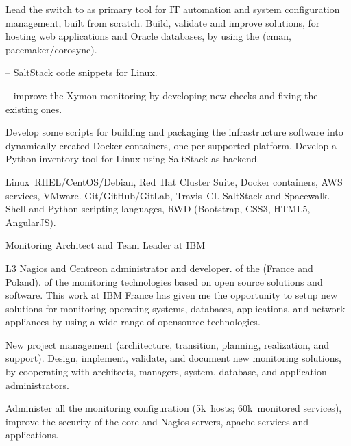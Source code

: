 \smallskip\noindent
\tasks
Lead the switch to  as primary tool for IT automation and system
configuration management, built from scratch.
Build, validate and improve  solutions,
for hosting web applications and Oracle databases, by using the
 (cman, pacemaker/corosync).

\smallskip\noindent
\software
{} --
SaltStack code snippets for Linux.

\tinyskip\noindent
{} --
improve the Xymon monitoring by developing new checks and fixing the
existing ones.

\tinyskip\noindent
Develop some scripts for building and packaging the infrastructure software
into dynamically created Docker containers, one per supported platform.
Develop a Python inventory tool for Linux using SaltStack as backend.

\tinyskip\noindent
\technologies
Linux~RHEL/CentOS/Debian, Red~Hat Cluster Suite, Docker containers,
AWS services, VMware. Git/GitHub/GitLab, Travis~CI. SaltStack and Spacewalk.
Shell and Python scripting languages, RWD (Bootstrap, CSS3, HTML5, AngularJS).


   {Monitoring Architect and Team Leader at IBM}

L3 Nagios and Centreon administrator and developer.
 of the 
(France and Poland).
 of the monitoring technologies based on open source
solutions and software.
This work at IBM France has given me the opportunity to setup new solutions
for monitoring operating systems, databases, applications, and network
appliances by using a wide range of opensource technologies.

\smallskip\noindent
\tasks
New project management
(architecture, transition, planning, realization, and support).
Design, implement, validate, and document new monitoring solutions,
by cooperating with architects, managers, system, database, and application
administrators.

\tinyskip
Administer all the monitoring configuration
(5k\smallplus~hosts; 60k\smallplus~monitored services), improve the security
of the core and Nagios servers, apache services and applications.

